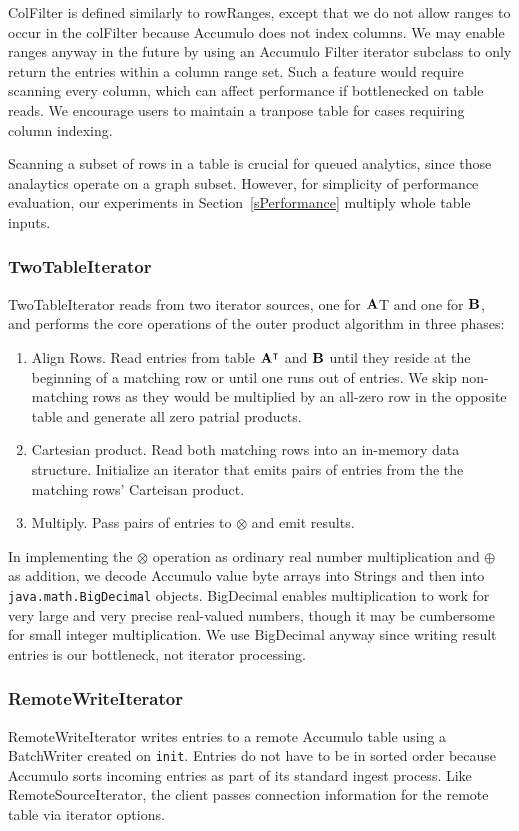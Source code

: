 ColFilter is defined similarly to rowRanges, except that we do not allow ranges to occur in the colFilter
because Accumulo does not index columns.  We may enable ranges anyway in the future by using an Accumulo
Filter iterator subclass to only return the entries within a column range set.
Such a feature would require scanning every column, 
which can affect performance if bottlenecked on table reads.
We encourage users to maintain a tranpose table for cases requiring column indexing.

Scanning a subset of rows in a table is crucial for queued analytics, since those analaytics 
operate on a graph subset.  However, for simplicity of performance evaluation, 
our experiments in Section~\ref{sPerformance} multiply whole table inputs.

\subsubsection{TwoTableIterator}
TwoTableIterator reads from two iterator sources, one for $\mathbf{A}$T and one for $\mathbf{B}$,
and performs the core operations of the outer product algorithm in three phases:
\begin{enumerate}
\item Align Rows.  Read entries from table $\mathbf{A^{\intercal}}$ and $\mathbf{B}$ until they reside at the beginning of a matching row
or until one runs out of entries. We skip non-matching rows as they would be multiplied by an all-zero row in the
opposite table and generate all zero patrial products.
\item Cartesian product. Read both matching rows into an in-memory data structure. 
Initialize an iterator that emits pairs of entries from the the matching rows' Carteisan product.
\item Multiply. Pass pairs of entries to $\otimes$ and emit results. 
\end{enumerate}

In implementing the $\otimes$ operation as ordinary real number multiplication and $\oplus$ as addition,
we decode Accumulo value byte arrays into Strings and then into \texttt{java.math.BigDecimal}
objects. BigDecimal enables multiplication to work for very large and very precise real-valued numbers,
though it may be cumbersome for small integer multiplication. We use BigDecimal anyway since 
writing result entries is our bottleneck, not iterator processing.

\subsubsection{RemoteWriteIterator}
RemoteWriteIterator writes entries to a remote Accumulo table using a BatchWriter created on \texttt{init}.
Entries do not have to be in sorted order because Accumulo sorts incoming entries as part of its
standard ingest process. Like RemoteSourceIterator, the client passes connection information 
for the remote table via iterator options.

